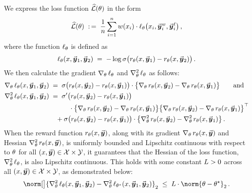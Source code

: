 	We express the loss function $\widehat{\mathcal{L}}(\theta)$ in the form
	\begin{align*}
		\widehat{\mathcal{L}}(\theta) \; :\,= \;
		\frac{1}{n} \sum_{i=1}^{n} w(x_{i}) \cdot \ell_{\theta}\big(x_{i}, \vec{\boldsymbol{y}}\!\,^w_{i}, \vec{\boldsymbol{y}}\!\,^{\ell}_{i}\big) \, ,
	\end{align*}
	where the function $\ell_{\theta}$ is defined as
	\begin{align*}
		\ell_{\theta}(x, \vec{\boldsymbol{y}}\!\,_{1}, \vec{\boldsymbol{y}}\!\,_{2})
		\; = \; - \log \sigma \big( r_{\theta}(x, \vec{\boldsymbol{y}}\!\,_{1}) - r_{\theta}(x, \vec{\boldsymbol{y}}\!\,_{2}) \big) \, .
	\end{align*}
	We then calculate the gradient $\nabla_{\theta} \,  \ell_{\theta}$ and $\nabla_{\theta}^2 \,  \ell_{\theta}$ as follows:
	\begin{align*}
		\gradtheta \lliketheta(\prompt, \responsei{1}, \responsei{2})
		& \; = \; \sigmoid\big( \rewardtheta(\prompt, \responsei{2}) - \rewardtheta(\prompt, \responsei{1}) \big) \cdot \big\{ \gradtheta \rewardtheta(\prompt, \responsei{2}) - \gradtheta \rewardtheta(\prompt, \responsei{1})  \big\} \qquad \mbox{and}  \\
		\hesstheta \lliketheta(\prompt, \responsei{1}, \responsei{2})
		& \; = \; \divsigmoid\big( \rewardtheta(\prompt, \responsei{2}) - \rewardtheta(\prompt, \responsei{1}) \big) \\
        & \qquad \quad
        \cdot \big\{ \gradtheta \rewardtheta(\prompt, \responsei{2}) - \gradtheta \rewardtheta(\prompt, \responsei{1}) \big\} \big\{ \gradtheta \rewardtheta(\prompt, \responsei{2}) - \gradtheta \rewardtheta(\prompt, \responsei{1}) \big\}^{\top}  \\
		& \quad + \sigmoid\big( \rewardtheta(\prompt, \responsei{2}) - \rewardtheta(\prompt, \responsei{1}) \big) \cdot \big\{ \hesstheta \rewardtheta(\prompt, \responsei{2}) - \hesstheta \rewardtheta(\prompt, \responsei{1})  \big\} \, .
	\end{align*}
	When the reward function $r_{\theta}(x, \vec{\boldsymbol{y}}\!\,)$, along with its gradient $\nabla_{\theta} \,  r_{\theta}(x, \vec{\boldsymbol{y}}\!\,)$ and Hessian $\nabla_{\theta}^2 \,  r_{\theta}(x, \vec{\boldsymbol{y}}\!\,)$, is uniformly bounded and Lipschitz continuous with respect to $\theta$ for all $(x, \vec{\boldsymbol{y}}\!\,) \in \mathcal{X} \times \mathcal{Y}$, it guarantees that the Hessian of the loss function, $\nabla_{\theta}^2 \,  \ell_{\theta}$, is also Lipschitz continuous. This holds with some constant $L > 0$ across all $(x, \vec{\boldsymbol{y}}\!\,) \in \mathcal{X} \times \mathcal{Y}$, as demonstrated below:
	\begin{align*}
		\norm[\big]{\hesstheta \lliketheta (\prompt, \responsei{1}, \responsei{2}) - \hesstheta \llikethetastar (\prompt, \responsei{1}, \responsei{2})}_2
		\; \leq \; \Liphess \cdot \norm{\paratheta - \parathetastar}_2 \, .
	\end{align*}
